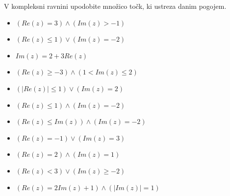             \begin{naloga}
                V kompleksni ravnini upodobite množico točk, ki ustreza danim pogojem.

                \begin{itemize}
                        \item $\left(Re(z)=3\right) \land \left(Im(z)>-1\right)$ 
                        \item $\left(Re(z)\leq 1\right) \lor \left(Im(z)=-2\right)$ 
                        \item $Im(z)=2+3Re(z)$ 
                        \item $\left(Re(z)\geq -3\right) \land \left(1<Im(z)\leq 2\right)$ 
                        \item $\left(\lvert Re(z)\rvert\leq 1\right) \lor \left(Im(z)=2\right)$ 
                        \item $\left(Re(z)\leq 1\right) \land \left(Im(z)=-2\right)$ 

                        \item $\left(Re(z)\leq Im(z)\right) \land \left(Im(z)=-2\right)$ 
                        \item $\left(Re(z)=-1\right) \lor \left(Im(z)=3\right)$ 
                        \item $\left(Re(z)=2\right) \land \left(Im(z)=1\right)$ 
                        \item $\left(Re(z)<3\right) \lor \left(Im(z)\geq -2\right)$ 
                        \item $\left(Re(z)=2Im(z)+1\right) \land \left(\lvert Im(z)\rvert =1\right)$ 
                    \end{itemize}

                \end{naloga}


